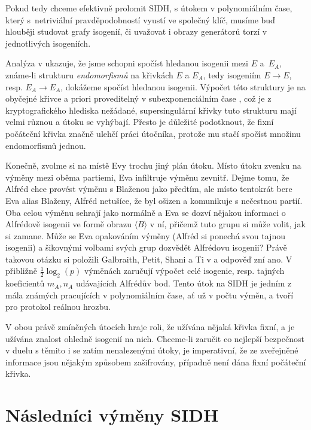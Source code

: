 \documentclass[12pt]{report}
\begin{document}
Pokud tedy chceme efektivně prolomit SIDH, s útokem v polynomiálním čase, který s~netriviální pravděpodobností vyustí ve společný klíč, musíme buď hlouběji studovat grafy isogenií, či uvažovat i obrazy generátorů torzí v jednotlivých isogeniích.

Analýza v \cite[Sec. 4.2]{Galbraith4} ukazuje, že jsme schopni spočíst hledanou isogenii mezi $E$ a~$E_A$, známe-li strukturu \textit{endomorfismů} na křivkách $E$ a $E_A$, tedy isogeniím $E \longrightarrow E$, resp. $E_A \longrightarrow E_A$, dokážeme spočíst hledanou isogenii. Výpočet této struktury je na obyčejné křivce a priori proveditelný v subexponenciálním čase \cite{Bisson}, což je z kryptografického hlediska nežádané, supersingulární křivky tuto strukturu mají velmi různou a útoku se vyhýbají. Přesto je důležité podotknout, že fixní počáteční křivka značně ulehčí práci útočníka, protože mu stačí spočíst množinu endomorfismů jednou.

Konečně, zvolme si na místě Evy trochu jiný plán útoku. Místo útoku zvenku na výměny mezi oběma partiemi, Eva infiltruje výměnu zevnitř. Dejme tomu, že Alfréd chce provést výměnu s Blaženou jako předtím, ale místo tentokrát bere Eva alias Blaženy, Alfréd netušíce, že byl ošizen a komunikuje s nečestnou partií. Oba celou výměnu sehrají jako normálně a Eva se dozví nějakou informaci o Alfrédově isogenii ve formě obrazu $\langle B \rangle$ v ní, přičemž tuto grupu si může volit, jak si zamane. Může se Eva opakováním výměny (Alfréd si ponechá svou tajnou isogenii) a šikovnými volbami svých grup dozvědět Alfrédovu isogenii? Právě takovou otázku si položili Galbraith, Petit, Shani a Ti v \cite{Galbraith4} a odpověď zní ano. V přibližně $\frac{1}{2} \log_2 (p)$ výměnách zaručují výpočet celé isogenie, resp. tajných koeficientů $m_A,n_A$ udávajících Alfrédův bod. Tento útok na SIDH  je jedním z mála známých pracujících v polynomiálním čase, ať už v počtu výměn, a tvoří pro protokol reálnou hrozbu.

V obou právě zmíněných útocích hraje roli, že užívána nějaká křivka fixní, a je užívána znalost ohledně isogenií na nich. Chceme-li zaručit co nejlepší bezpečnost v duelu s těmito i se zatím nenalezenými útoky, je imperativní, že ze zveřejněné informace jsou nějakým způsobem zašifrovány, případně není dána fixní počáteční křivka. 



\section{Následníci výměny SIDH}
\end{document}
